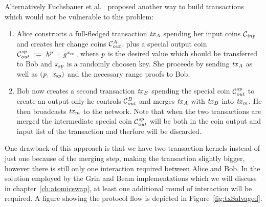 Alternatively Fuchsbauer et al.~\cite{fuchsbauer2019aggregate} proposed another way to build transactions which would not be vulnerable to this problem:
\begin{enumerate}
    \item Alice constructs a full-fledged transaction $\mathit{tx}_A$ spending her input coins $\mathcal{C}_{\mathit{inp}}$ and creates her change coins $\mathcal{C}_{\mathit{out}}^A$, plus a special output coin $\mathcal{C}_{\mathit{out}}^{\mathit{sp}} ~:=~ \mathit{h}^{\mathit{p}} ~\cdot~ \mathit{g}^{\mathit{x}_{sp}}$,
    where $\mathit{p}$ is the desired value which should be transferred to Bob and $\mathit{x}_{sp}$ is a randomly choosen key. She proceeds by sending $\mathit{tx}_A$ as well as $(\mathit{p} ,~ \mathit{x}_{sp})$ and the necessary range
    proofs to Bob.
    \item Bob now creates a second transaction $\mathit{tx}_B$ spending the special coin $\mathcal{C}_{\mathit{out}}^{\mathit{sp}}$ to create an output only he controls $\mathcal{C}_{\mathit{out}}^{\mathit{B}}$ and merges $\mathit{tx}_A$ with $\mathit{tx}_B$
    into $\mathit{tx}_m$. He then broadcasts $\mathit{tx}_m$ to the network. Note that when the two transactions are merged the intermediate special coin $\mathcal{C}_{\mathit{out}}^{\mathit{sp}}$ will be both in the coin output and input list
    of the transaction and therfore will be discarded.
\end{enumerate}
One drawback of this approach is that we have two transaction kernels instead of just one because of the merging step, making the transaction slightly bigger, however there is still only one interaction required between Alice and Bob.
In the solution employed by the Grin and Beam implementations which we will discuss in chapter~\ref{ch:atomicswap}, at least one additional round of interaction will be required.
A figure showing the protocol flow is depicted in Figure~\ref{fig:txSalvaged}.

